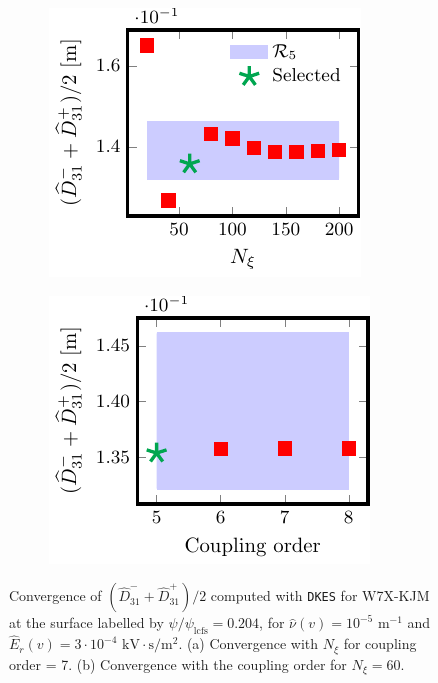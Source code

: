 \documentclass[10pt]{iopart}
\newcommand{\DKES}{{\texttt{DKES}}}
\begin{document}
\begin{figure}[t]
	\centering
	\begin{subfigure}[t]{0.32\textwidth}
		\includegraphics{DKES-Convergence-Legendre-W7X-KJM-s0204-Er-3e-4-D31-Detail}
%		
		\caption{}
		\label{subfig:DKES_D31_convergence_Legendre_W7X_KJM_0204_Erho_3e-4_Detail}
	\end{subfigure}
	\begin{subfigure}[t]{0.32\textwidth}
		\includegraphics{DKES-Convergence-theta-zeta-W7X-KJM-s0204-Er-3e-4-D31}
		\caption{}
		\label{subfig:DKES_D31_convergence_Coupling_parameter_W7X_KJM_0204_Erho_3e-4}
	\end{subfigure}
	
	\caption{Convergence of $(\widehat{D}_{31}^- + \widehat{D}_{31}^+) /2$ computed with {\DKES} for W7X-KJM at the surface labelled by $\psi/\psi_{\text{lcfs}}=0.204$, for $\hat{\nu}(v)=10^{-5}$ $\text{m}^{-1}$ and $\widehat{E}_r(v)=3\cdot 10^{-4}$ $\text{kV}\cdot\text{s}/\text{m}^2$. (a) Convergence with $N_\xi$ for coupling order = 7. (b) Convergence with the coupling order for $N_\xi= 60$.}
	\label{fig:DKES_Convergence_W7X_KJM_Er_3e-4}
\end{figure}
\end{document}
